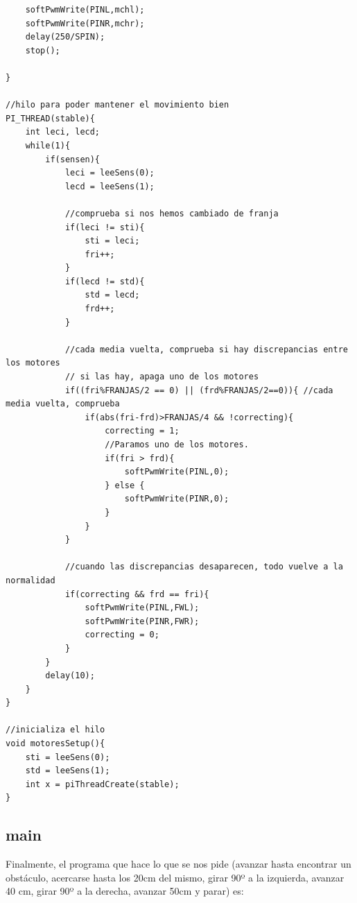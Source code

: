 \documentclass[11pt, a4paper]{article}
\begin{document}
\begin{verbatim}
    softPwmWrite(PINL,mchl);
    softPwmWrite(PINR,mchr);
    delay(250/SPIN);
    stop();
    
}

//hilo para poder mantener el movimiento bien
PI_THREAD(stable){
    int leci, lecd;
    while(1){
        if(sensen){
            leci = leeSens(0);
            lecd = leeSens(1);
            
            //comprueba si nos hemos cambiado de franja
            if(leci != sti){
                sti = leci;
                fri++;
            }
            if(lecd != std){
                std = lecd;
                frd++;
            }
            
            //cada media vuelta, comprueba si hay discrepancias entre los motores
            // si las hay, apaga uno de los motores
            if((fri%FRANJAS/2 == 0) || (frd%FRANJAS/2==0)){ //cada media vuelta, comprueba
                if(abs(fri-frd)>FRANJAS/4 && !correcting){
                    correcting = 1;
                    //Paramos uno de los motores.
                    if(fri > frd){
                        softPwmWrite(PINL,0);
                    } else {
                        softPwmWrite(PINR,0);
                    }
                }
            }
            
            //cuando las discrepancias desaparecen, todo vuelve a la normalidad
            if(correcting && frd == fri){
                softPwmWrite(PINL,FWL);
                softPwmWrite(PINR,FWR);
                correcting = 0;
            }
        }
        delay(10);
    }
}

//inicializa el hilo
void motoresSetup(){
    sti = leeSens(0);
    std = leeSens(1);
    int x = piThreadCreate(stable);
}
		\end{verbatim}
		
	\subsection{main}
	
	Finalmente, el programa que hace lo que se nos pide (avanzar hasta encontrar un obstáculo, acercarse hasta los 20cm del mismo, girar 90º a la izquierda, avanzar 40 cm, girar 90º a la derecha, avanzar 50cm y parar) es:
	
\end{document}

